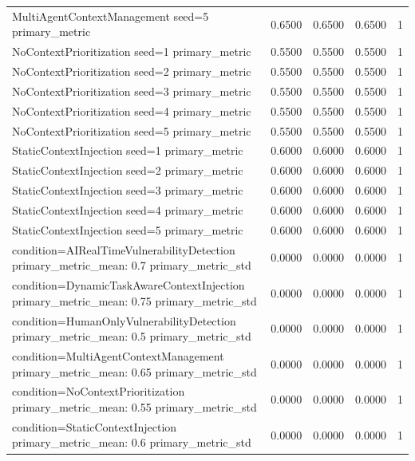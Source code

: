\begin{table}[h]
\begin{tabular}{lrrrr}
MultiAgentContextManagement seed=5 primary_metric & 0.6500 & 0.6500 & 0.6500 & 1 \\
NoContextPrioritization seed=1 primary_metric & 0.5500 & 0.5500 & 0.5500 & 1 \\
NoContextPrioritization seed=2 primary_metric & 0.5500 & 0.5500 & 0.5500 & 1 \\
NoContextPrioritization seed=3 primary_metric & 0.5500 & 0.5500 & 0.5500 & 1 \\
NoContextPrioritization seed=4 primary_metric & 0.5500 & 0.5500 & 0.5500 & 1 \\
NoContextPrioritization seed=5 primary_metric & 0.5500 & 0.5500 & 0.5500 & 1 \\
StaticContextInjection seed=1 primary_metric & 0.6000 & 0.6000 & 0.6000 & 1 \\
StaticContextInjection seed=2 primary_metric & 0.6000 & 0.6000 & 0.6000 & 1 \\
StaticContextInjection seed=3 primary_metric & 0.6000 & 0.6000 & 0.6000 & 1 \\
StaticContextInjection seed=4 primary_metric & 0.6000 & 0.6000 & 0.6000 & 1 \\
StaticContextInjection seed=5 primary_metric & 0.6000 & 0.6000 & 0.6000 & 1 \\
condition=AIRealTimeVulnerabilityDetection primary_metric_mean: 0.7 primary_metric_std & 0.0000 & 0.0000 & 0.0000 & 1 \\
condition=DynamicTaskAwareContextInjection primary_metric_mean: 0.75 primary_metric_std & 0.0000 & 0.0000 & 0.0000 & 1 \\
condition=HumanOnlyVulnerabilityDetection primary_metric_mean: 0.5 primary_metric_std & 0.0000 & 0.0000 & 0.0000 & 1 \\
condition=MultiAgentContextManagement primary_metric_mean: 0.65 primary_metric_std & 0.0000 & 0.0000 & 0.0000 & 1 \\
condition=NoContextPrioritization primary_metric_mean: 0.55 primary_metric_std & 0.0000 & 0.0000 & 0.0000 & 1 \\
condition=StaticContextInjection primary_metric_mean: 0.6 primary_metric_std & 0.0000 & 0.0000 & 0.0000 & 1 \\
\hline
\end{tabular}
\end{table}